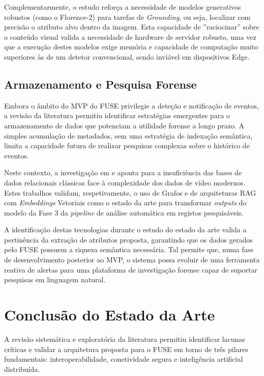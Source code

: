 Complementarmente, o estudo \cite{chen_florence-vl_2025} reforça a necessidade de modelos generativos robustos (como o Florence-2) para tarefas de \textit{Grounding}, ou seja, localizar com precisão o atributo alvo dentro da imagem. Esta capacidade de ''raciocinar'' sobre o conteúdo visual valida a necessidade de hardware de servidor robusto, uma vez que a execução destes modelos exige memória e capacidade de computação muito superiores às de um detetor convencional, sendo inviável em dispositivos Edge.

\subsection{Armazenamento e Pesquisa Forense}
\label{subsec:storage_future}

Embora o âmbito do \gls{MVP} do \gls{FUSE} privilegie a deteção e notificação de eventos, a revisão da literatura permitiu identificar estratégias emergentes para o armazenamento de dados que potenciam a utilidade forense a longo prazo. A simples acumulação de metadados, sem uma estratégia de indexação semântica, limita a capacidade futura de realizar pesquisas complexas sobre o histórico de eventos.

Neste contexto, a investigação em \cite{pham_deep_2025} e \cite{j_advanced_2025} aponta para a insuficiência das bases de dados relacionais clássicas face à complexidade dos dados de vídeo modernos. Estes trabalhos validam, respetivamente, o uso de Grafos e de arquiteturas \gls{RAG} com \textit{Embeddings} Vetoriais como o estado da arte para transformar \textit{outputs} do modelo da Fase 3 da \textit{pipeline} de análise automática em registos pesquisáveis.

A identificação destas tecnologias durante o estudo do estado da arte valida a pertinência da extração de atributos proposta, garantindo que os dados gerados pelo \gls{FUSE} possuem a riqueza semântica necessária. Tal permite que, numa fase de desenvolvimento posterior ao \gls{MVP}, o sistema possa evoluir de uma ferramenta reativa de alertas para uma plataforma de investigação forense capaz de suportar pesquisas em linguagem natural.

\section{Conclusão do Estado da Arte}
\label{sec:conclusao_estado_arte}

A revisão sistemática e exploratória da literatura permitiu identificar lacunas críticas e validar a arquitetura proposta para o \gls{FUSE} em torno de três pilares fundamentais: interoperabilidade, conetividade segura e inteligência artificial distribuída.


